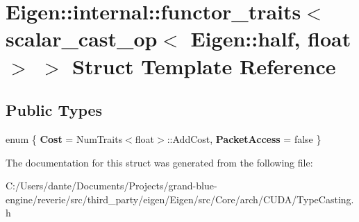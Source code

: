 \hypertarget{struct_eigen_1_1internal_1_1functor__traits_3_01scalar__cast__op_3_01_eigen_1_1half_00_01float_01_4_01_4}{}\section{Eigen\+::internal\+::functor\+\_\+traits$<$ scalar\+\_\+cast\+\_\+op$<$ Eigen\+::half, float $>$ $>$ Struct Template Reference}
\label{struct_eigen_1_1internal_1_1functor__traits_3_01scalar__cast__op_3_01_eigen_1_1half_00_01float_01_4_01_4}
\subsection*{Public Types}
\begin{DoxyCompactItemize}
\item 
\mbox{\label{struct_eigen_1_1internal_1_1functor__traits_3_01scalar__cast__op_3_01_eigen_1_1half_00_01float_01_4_01_4_a2a429059262489a50f370ebee943b789}} 
enum \{ {\bfseries Cost} = Num\+Traits$<$float$>$\+::Add\+Cost, 
{\bfseries Packet\+Access} = false
 \}
\end{DoxyCompactItemize}


The documentation for this struct was generated from the following file\+:\begin{DoxyCompactItemize}
\item 
C\+:/\+Users/dante/\+Documents/\+Projects/grand-\/blue-\/engine/reverie/src/third\+\_\+party/eigen/\+Eigen/src/\+Core/arch/\+C\+U\+D\+A/Type\+Casting.\+h\end{DoxyCompactItemize}
